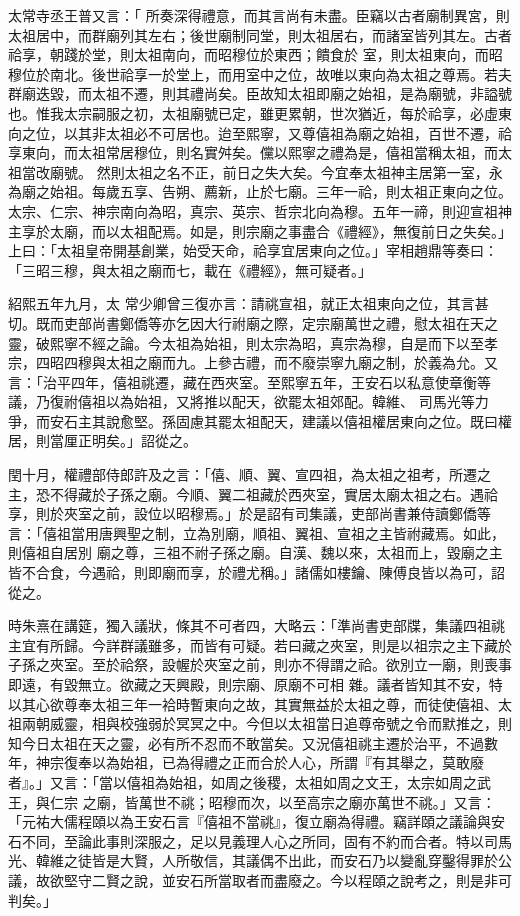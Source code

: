 \begin{pinyinscope}
太常寺丞王普又言：「
 所奏深得禮意，而其言尚有未盡。臣竊以古者廟制異宮，則太祖居中，而群廟列其左右；後世廟制同堂，則太祖居右，而諸室皆列其左。古者祫享，朝踐於堂，則太祖南向，而昭穆位於東西；饋食於
 室，則太祖東向，而昭穆位於南北。後世祫享一於堂上，而用室中之位，故唯以東向為太祖之尊焉。若夫群廟迭毀，而太祖不遷，則其禮尚矣。臣故知太祖即廟之始祖，是為廟號，非謚號也。惟我太宗嗣服之初，太祖廟號已定，雖更累朝，世次猶近，每於祫享，必虛東向之位，以其非太祖必不可居也。迨至熙寧，又尊僖祖為廟之始祖，百世不遷，祫享東向，而太祖常居穆位，則名實舛矣。儻以熙寧之禮為是，僖祖當稱太祖，而太祖當改廟號。
 然則太祖之名不正，前日之失大矣。今宜奉太祖神主居第一室，永為廟之始祖。每歲五享、告朔、薦新，止於七廟。三年一祫，則太祖正東向之位。太宗、仁宗、神宗南向為昭，真宗、英宗、哲宗北向為穆。五年一禘，則迎宣祖神主享於太廟，而以太祖配焉。如是，則宗廟之事盡合《禮經》，無復前日之失矣。」上曰：「太祖皇帝開基創業，始受天命，祫享宜居東向之位。」宰相趙鼎等奏曰：「三昭三穆，與太祖之廟而七，載在《禮經》，無可疑者。」



 紹熙五年九月，太
 常少卿曾三復亦言：請祧宣祖，就正太祖東向之位，其言甚切。既而吏部尚書鄭僑等亦乞因大行祔廟之際，定宗廟萬世之禮，慰太祖在天之靈，破熙寧不經之論。今太祖為始祖，則太宗為昭，真宗為穆，自是而下以至孝宗，四昭四穆與太祖之廟而九。上參古禮，而不廢崇寧九廟之制，於義為允。又言：「治平四年，僖祖祧遷，藏在西夾室。至熙寧五年，王安石以私意使章衡等議，乃復祔僖祖以為始祖，又將推以配天，欲罷太祖郊配。韓維、
 司馬光等力爭，而安石主其說愈堅。孫固慮其罷太祖配天，建議以僖祖權居東向之位。既曰權居，則當厘正明矣。」詔從之。



 閏十月，權禮部侍郎許及之言：「僖、順、翼、宣四祖，為太祖之祖考，所遷之主，恐不得藏於子孫之廟。今順、翼二祖藏於西夾室，實居太廟太祖之右。遇祫享，則於夾室之前，設位以昭穆焉。」於是詔有司集議，吏部尚書兼侍讀鄭僑等言：「僖祖當用唐興聖之制，立為別廟，順祖、翼祖、宣祖之主皆祔藏焉。如此，則僖祖自居別
 廟之尊，三祖不祔子孫之廟。自漢、魏以來，太祖而上，毀廟之主皆不合食，今遇祫，則即廟而享，於禮尤稱。」諸儒如樓鑰、陳傅良皆以為可，詔從之。



 時朱熹在講筵，獨入議狀，條其不可者四，大略云：「準尚書吏部牒，集議四祖祧主宜有所歸。今詳群議雖多，而皆有可疑。若曰藏之夾室，則是以祖宗之主下藏於子孫之夾室。至於祫祭，設幄於夾室之前，則亦不得謂之祫。欲別立一廟，則喪事即遠，有毀無立。欲藏之天興殿，則宗廟、原廟不可相
 雜。議者皆知其不安，特以其心欲尊奉太祖三年一袷時暫東向之故，其實無益於太祖之尊，而徒使僖祖、太祖兩朝威靈，相與校強弱於冥冥之中。今但以太祖當日追尊帝號之令而默推之，則知今日太祖在天之靈，必有所不忍而不敢當矣。又況僖祖祧主遷於治平，不過數年，神宗復奉以為始祖，已為得禮之正而合於人心，所謂『有其舉之，莫敢廢者』。」又言：「當以僖祖為始祖，如周之後稷，太祖如周之文王，太宗如周之武王，與仁宗
 之廟，皆萬世不祧；昭穆而次，以至高宗之廟亦萬世不祧。」又言：「元祐大儒程頤以為王安石言『僖祖不當祧』，復立廟為得禮。竊詳頤之議論與安石不同，至論此事則深服之，足以見義理人心之所同，固有不約而合者。特以司馬光、韓維之徒皆是大賢，人所敬信，其議偶不出此，而安石乃以變亂穿鑿得罪於公議，故欲堅守二賢之說，並安石所當取者而盡廢之。今以程頤之說考之，則是非可判矣。」




\end{pinyinscope}
